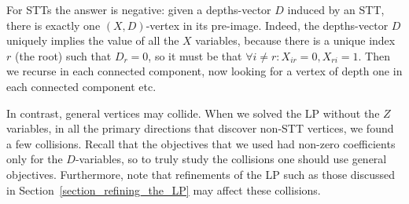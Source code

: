 For STTs the answer is negative: given a depths-vector $D$ induced by an STT, there is exactly one $(X,D)$-vertex in its pre-image. Indeed, the depths-vector $D$ uniquely implies the value of all the $X$ variables, because there is a unique index $r$ (the root) such that $D_r=0$, so it must be that $\forall i \ne r: X_{ir}=0,X_{ri}=1$. Then we recurse in each connected component, now looking for a vertex of depth one in each connected component etc.

In contrast, general vertices may collide. When we solved the LP without the $Z$ variables, in all the primary directions that discover non-STT vertices, we found a few collisions. Recall that the objectives that we used had non-zero coefficients only for the $D$-variables, so to truly study the collisions one should use general objectives. Furthermore, note that refinements of the LP such as those discussed in Section~\ref{section_refining_the_LP} may affect these collisions.

